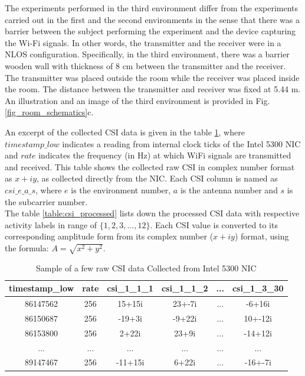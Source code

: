 \documentclass[conference]{IEEEtran}
\begin{document}
The experiments performed in the third environment differ from the experiments carried out in the first and the second environments in the sense that there was a barrier between the subject performing the experiment and the device capturing the Wi-Fi signals. In other words, the transmitter and the receiver were in a NLOS configuration. Specifically, in the third environment, there was a barrier wooden wall with thickness of 8 cm between the transmitter and the receiver. The transmitter was placed outside the room while the receiver was placed inside the room. The distance between the transmitter and receiver was fixed at 5.44 m. An illustration and an image of the third environment is provided in Fig. \ref{fig_room_schematics}c.

An excerpt of the collected CSI data is given in the table \ref{table:csi_raw}, where $timestamp\_low$ indicates a reading from internal clock ticks of the Intel 5300 NIC and $rate$ indicates the frequency (in Hz) at which WiFi signals are transmitted and received. This table shows the collected raw CSI in complex number format as $x+iy$, as collected directly from the NIC. Each CSI column is named as $csi\_e\_a\_s$, where $e$ is the environment number, $a$ is the  antenna number and $s$ is the subcarrier number.\\
The table \ref{table:csi_processed} lists down the processed CSI data with respective activity labels in range of $\{1, 2, 3, ..., 12\}$. Each CSI value is converted to its corresponding amplitude form from its complex number ($x+iy$) format, using the formula: $A = \sqrt{x^2 + y^2}$.


\begin{table}
    \begin{tabular}{| c | c |c | c | c| c|} 
     \hline
     timestamp\_low & rate & csi\_1\_1\_1 & csi\_1\_1\_2 & ... & csi\_1\_3\_30\\ [0.2ex]
     \hline\hline
     86147562 & 256 & 15+15i & 23+-7i & ... & -6+16i \\ [1ex]
     \hline
     86150687 & 256 & -19+3i & -9+22i & ... & 10+-12i \\ [1ex]
     \hline
     86153800 & 256 &  2+22i &  23+9i & ... & -14+12i \\ [1ex]
     \hline
     ... & ... &  ... &  ... & ... & ... \\ [1ex]
     \hline
     89147467 & 256 & -11+15i & 6+22i & ... & -16+-7i \\ [1ex]
     \hline\hline
    \end{tabular}
\caption{\label{table:csi_raw}Sample of a few raw CSI data Collected from Intel 5300 NIC}
\end{table}
\end{document}
